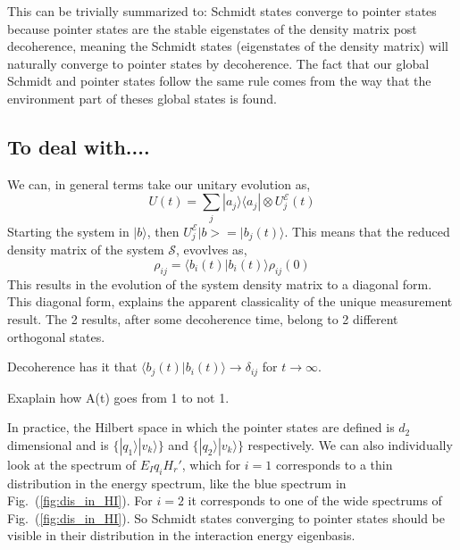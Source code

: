 \documentclass{article}
\begin{document}
This can be trivially summarized to: Schmidt states converge to pointer states because pointer states are the stable eigenstates of the density matrix post decoherence, meaning the Schmidt states (eigenstates of the density matrix) will naturally converge to pointer states by decoherence. The fact that our global Schmidt and pointer states follow the same rule comes from the way that the environment part of theses global states is found. 


\subsection{To deal with....}


We can, in general terms take our unitary evolution as,
\begin{equation}
    U(t)=\sum_j|a_j\rangle\langle a_j|\otimes U^{\mathcal{E}}_j(t)
\end{equation}
Starting the system in $|b\rangle$, then $U_j^{\mathcal{E}}|b>=|b_j(t)\rangle$. This means that the reduced density matrix of the system $\mathcal{S}$, evovlves as,
\begin{equation}
    \rho_{ij} = \langle b_i(t)|b_i(t)\rangle \rho_{ij}(0)
\end{equation}
This results in the evolution of the system density matrix to a diagonal form. This diagonal form, explains the apparent classicality of the unique measurement result. The 2 results, after some decoherence time, belong to 2 different orthogonal states. 


Decoherence has it that $\langle b_j(t)|b_i(t)\rangle\rightarrow \delta_{ij}$ for $t\rightarrow \infty$. 



Exaplain how A(t) goes from 1 to not 1. 





In practice, the Hilbert space in which the pointer states are defined is $d_2$ dimensional and is $\{|q_1\rangle|v_k\rangle\}$ and $\{|q_2\rangle|v_k\rangle\}$ respectively. We can also individually look at the spectrum of $E_Iq_iH_r'$, which for $i=1$ corresponds to a thin distribution in the energy spectrum, like the blue spectrum in Fig.~(\ref{fig:dis_in_HI}). For $i=2$ it corresponds to one of the wide spectrums of Fig.~(\ref{fig:dis_in_HI}). So Schmidt states converging to pointer states should be visible in their distribution in the interaction energy eigenbasis.
\end{document}
